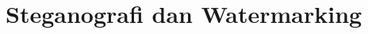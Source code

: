 \documentclass[../main.tex]{subfiles}
\begin{document}
\chapter{Steganografi dan Watermarking}
\end{document}
